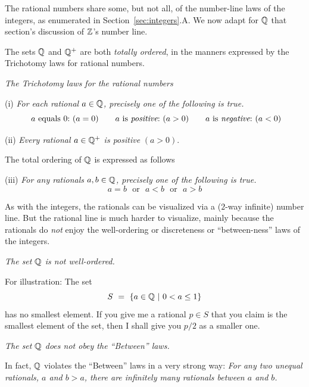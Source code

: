 The rational numbers share some, but not all, of the number-line laws of the integers, as enumerated in Section~\ref{sec:integers}.A.  We now adapt for $\mathbb{Q}$ that section's discussion of $\mathbb{Z}$'s number line.

\smallskip

The sets $\mathbb{Q}$ and $\mathbb{Q}^+$ are both {\em totally ordered}, in the manners expressed by the Trichotomy laws for rational numbers.

\medskip

\noindent
{\it The Trichotomy laws for the rational numbers}
 

\noindent (i)
{\it For each rational $a \in \mathbb{Q}$, precisely one of the following is true.}
\[
\mbox{ $a$ equals $0$:} \ (a=0) \ \ \ \
\ \mbox{ $a$ is {\em positive}:} \ (a>0) \ \ \ \
 \ \mbox{ $a$ is {\em negative}:} \ (a<0)
\]

\noindent (ii)
{\it Every rational $a \in \mathbb{Q}^+$ is positive} $(a>0)$.

\medskip

\noindent
The total ordering of $\mathbb{Q}$ is expressed as follows 

\noindent (iii)
{\it For any rationals $a, b \in \mathbb{Q}$, precisely one of the following is true.}
\[  a=b \ \ \ \mbox{or} \ \ \  a<b \ \ \ \mbox{or} \ \ \ a>b \]

\smallskip

As with the integers, the rationals can be visualized via a ($2$-way infinite) number line.  But the rational line is much harder to visualize, mainly because the rationals do {\em not} enjoy the
well-ordering or discreteness or ``between-ness'' laws of the integers.

\medskip

\noindent
{\em The set $\mathbb{Q}$ is {\em not} well-ordered.}

\smallskip

For illustration:  The set
\[ S \ = \ \{ a \in \mathbb{Q}  \ |\ 0 < a \leq 1 \} \]
has no smallest element.  If you give me a rational $p \in S$ that you claim is the smallest element of the set, then I shall give you $p/2$ as a smaller one.

\medskip

\noindent
{\em The set $\mathbb{Q}$ does {\em not} obey the ``Between'' laws.}

\smallskip

In fact, $\mathbb{Q}$ violates the ``Between'' laws in a very strong way: {\it For any two unequal rationals, $a$ and $b>a$, there are infinitely many rationals between $a$ and $b$.}

